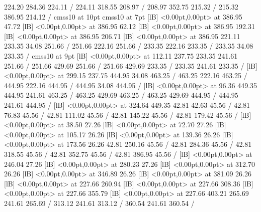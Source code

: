 { 224.20 284.36 224.11 /
 224.11 318.55 208.97 /
 208.97 352.75 215.32 /
 215.32 386.95 214.12 /
\font\picfont cmss10 at 10pt\picfont
\font\picfont cmss10 at 7pt\picfont
{}  [lB] <0.00pt,0.00pt> at 386.95 47.72
  [lB] <0.00pt,0.00pt> at 386.95 62.12
  [lB] <0.00pt,0.00pt> at 386.95 192.31
  [lB] <0.00pt,0.00pt> at 386.95 206.71
  [lB] <0.00pt,0.00pt> at 386.95 221.11
\setsolid
{} 233.35 34.08 251.66 /
 251.66 222.16 251.66 /
 233.35 222.16 233.35 /
 233.35 34.08 233.35 /
\font\picfont cmss10 at 9pt\picfont
{}  [lB] <0.00pt,0.00pt> at 112.11 237.75
\setsolid
{} 233.35 241.61 251.66 /
 251.66 429.69 251.66 /
 251.66 429.69 233.35 /
 233.35 241.61 233.35 /
  [lB] <0.00pt,0.00pt> at 299.15 237.75
\setsolid
{} 444.95 34.08 463.25 /
 463.25 222.16 463.25 /
 444.95 222.16 444.95 /
 444.95 34.08 444.95 /
  [lB] <0.00pt,0.00pt> at 96.36 449.35
\setsolid
{} 444.95 241.61 463.25 /
 463.25 429.69 463.25 /
 463.25 429.69 444.95 /
 444.95 241.61 444.95 /
  [lB] <0.00pt,0.00pt> at 324.64 449.35
\setsolid
{} 42.81 42.63 45.56 /
\setsolid
{} 42.81 76.83 45.56 /
\setsolid
{} 42.81 111.02 45.56 /
\setsolid
{} 42.81 145.22 45.56 /
\setsolid
{} 42.81 179.42 45.56 /
  [lB] <0.00pt,0.00pt> at 38.50 27.26
  [lB] <0.00pt,0.00pt> at 72.70 27.26
  [lB] <0.00pt,0.00pt> at 105.17 26.26
  [lB] <0.00pt,0.00pt> at 139.36 26.26
  [lB] <0.00pt,0.00pt> at 173.56 26.26
\setsolid
{} 42.81 250.16 45.56 /
\setsolid
{} 42.81 284.36 45.56 /
\setsolid
{} 42.81 318.55 45.56 /
\setsolid
{} 42.81 352.75 45.56 /
\setsolid
{} 42.81 386.95 45.56 /
  [lB] <0.00pt,0.00pt> at 246.04 27.26
  [lB] <0.00pt,0.00pt> at 280.23 27.26
  [lB] <0.00pt,0.00pt> at 312.70 26.26
  [lB] <0.00pt,0.00pt> at 346.89 26.26
  [lB] <0.00pt,0.00pt> at 381.09 26.26
  [lB] <0.00pt,0.00pt> at 227.66 260.94
  [lB] <0.00pt,0.00pt> at 227.66 308.36
  [lB] <0.00pt,0.00pt> at 227.66 355.79
  [lB] <0.00pt,0.00pt> at 227.66 403.21
\setsolid
{} 265.69 241.61 265.69 /
\setsolid
{} 313.12 241.61 313.12 /
\setsolid
{} 360.54 241.61 360.54 /
}
